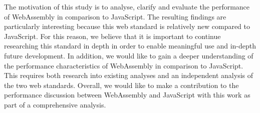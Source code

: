 The motivation of this study is to analyse, clarify and evaluate the performance of WebAssembly in comparison to JavaScript. The resulting findings are particularly interesting because this web standard is relatively new compared to JavaScript.
For this reason, we believe that it is important to continue researching this standard in depth in order to enable meaningful use and in-depth future development. In addition, we would like to gain a deeper understanding of the performance characteristics of WebAssembly in comparison to JavaScript. This requires both research into existing analyses and an independent analysis of the two web standards.
Overall, we would like to make a contribution to the performance discussion between WebAssembly and JavaScript with this work as part of a comprehensive analysis.